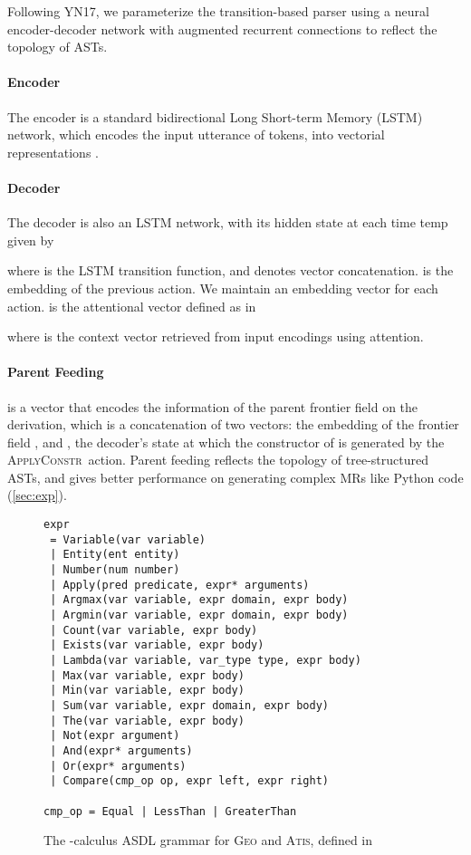 \documentclass[11pt,a4paper]{article}
\newcommand\applyconstrn{\textsc{ApplyConstr}}
\def\atis/{\textsc{Atis}}
\def\geo/{\textsc{Geo}}
\begin{document}
Following YN17, we parameterize the transition-based parser  using a neural encoder-decoder network with augmented recurrent connections to reflect the topology of ASTs.

\paragraph{Encoder} The encoder is a standard bidirectional Long Short-term Memory (LSTM) network, which encodes the input utterance  of  tokens,  into vectorial representations .

\paragraph{Decoder} The decoder is also an LSTM network, with its hidden state  at each time temp given by

where  is the LSTM transition function, and  denotes vector concatenation.
 is the embedding of the previous action. We maintain an embedding vector for each action. 
 is the attentional vector defined as in~\citet{luong2015effective}

where  is the context vector retrieved from input encodings  using attention.

\paragraph{Parent Feeding}  is a vector that encodes the information of the parent frontier field  on the derivation, which is a concatenation of two vectors: the embedding of the frontier field , and , the decoder's state at which the constructor of  is generated by the \applyconstrn~action. Parent feeding reflects the topology of tree-structured ASTs, and gives better performance on generating complex MRs like Python code (\autoref{sec:exp}).

\begin{figure}[t]
  \centering
\begin{lstlisting}[basicstyle=\fontfamily{cmtt}\small,columns=fullflexible,frame=bt]
expr 
 = Variable(var variable)
 | Entity(ent entity)
 | Number(num number)
 | Apply(pred predicate, expr* arguments)
 | Argmax(var variable, expr domain, expr body)
 | Argmin(var variable, expr domain, expr body)
 | Count(var variable, expr body)
 | Exists(var variable, expr body)
 | Lambda(var variable, var_type type, expr body)
 | Max(var variable, expr body)
 | Min(var variable, expr body)
 | Sum(var variable, expr domain, expr body)
 | The(var variable, expr body)
 | Not(expr argument)
 | And(expr* arguments)
 | Or(expr* arguments)
 | Compare(cmp_op op, expr left, expr right)

cmp_op = Equal | LessThan | GreaterThan
\end{lstlisting}
  \vspace{-2mm}
  \caption{The -calculus ASDL grammar for \geo/ and \atis/, defined in~\citet{rabinovich17syntaxnet}}
  \label{fig:asdl_atis}
  \vspace{-5mm}
\end{figure}
\end{document}

